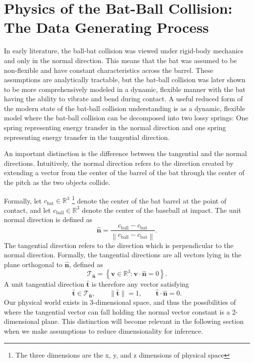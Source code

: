 \documentclass[11pt]{article}
\begin{document}
\section{Physics of the Bat-Ball Collision: The Data Generating Process}

In early literature, the ball-bat collision was viewed under rigid-body mechanics and only in the normal direction. This means that the bat was assumed to be non-flexible and have constant characteristics across the barrel. These assumptions are analytically tractable, but the bat-ball collision was later shown to be more comprehensively modeled in a dynamic, flexible manner with the bat having the ability to vibrate and bend during contact. A useful reduced form of the modern state of the bat-ball collision understanding is as a dynamic, flexible model where the bat-ball collision can be decomposed into two lossy springs: One spring representing energy transfer in the normal direction and one spring representing energy transfer in the tangential direction. \citep{nathan2000dynamics,cross1999impact,cross2006scattering,kensrud2017oblique, nathan2003characterizing}

An important distinction is the difference between the tangential and the normal directions. Intuitively, the normal direction refers to the direction created by extending a vector from the center of the barrel of the bat through the center of the pitch as the two objects collide. 

Formally, let \(c_{\mathrm{bat}}\in\mathbb{R}^3\) \footnote{The three dimensions are the x, y, and z dimensions of physical space} denote the center of the bat barrel at the point of contact, and let \(c_{\mathrm{ball}}\in\mathbb{R}^3\) denote the center of the baseball at impact. The unit normal direction is defined as
\[
\hat{\mathbf{n}}
=
\frac{c_{\mathrm{ball}}-c_{\mathrm{bat}}}
{\left\|c_{\mathrm{ball}}-c_{\mathrm{bat}}\right\|}.
\]
The tangential direction refers to the direction which is perpendicular to the normal direction. Formally, the tangential directions are all vectors lying in the plane orthogonal to \(\hat{\mathbf{n}}\), defined as
\[
\mathcal{T}_{\hat{\mathbf{n}}}
=
\left\{
\mathbf{v}\in\mathbb{R}^3:
\mathbf{v}\cdot \hat{\mathbf{n}}=0
\right\}.
\]
A unit tangential direction \(\hat{\mathbf{t}}\) is therefore any vector satisfying
\[
\hat{\mathbf{t}}\in \mathcal{T}_{\hat{\mathbf{n}}},
\qquad
\|\hat{\mathbf{t}}\|=1,
\qquad
\hat{\mathbf{t}}\cdot \hat{\mathbf{n}}=0.
\] Our physical world exists in 3-dimensional space, and thus the possibilities of where the tangential vector can fall holding the normal vector constant is a 2-dimensional plane. This distinction will become relevant in the following section when we make assumptions to reduce dimensionality for inference.
\end{document}
